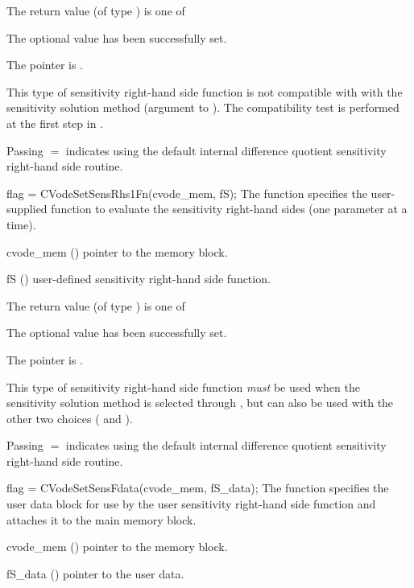 {
  The return value  (of type ) is one of
  \begin{args}
  \item[\Id{SUCCESS}] 
    The optional value has been successfully set.
  \item[\Id{CVS\_NO\_MEM}]
    The  pointer is .
  \end{args}
}
{
  This type of sensitivity right-hand side function is not compatible with
  with the  sensitivity solution method (argument 
  to ). The compatibility test is performed at the first
  step in .

  Passing $=$ indicates using the default internal difference 
  quotient sensitivity right-hand side routine.
}
{
  flag = CVodeSetSensRhs1Fn(cvode\_mem, fS);
}
{
  The function  specifies the user-supplied {\C} function
  to evaluate the sensitivity right-hand sides (one parameter at a time).
}
{
  \begin{args}
  \item[cvode\_mem] ()
    pointer to the {\cvodes} memory block.
  \item[fS] ()
    user-defined sensitivity right-hand side function.
  \end{args}
}
{
  The return value  (of type ) is one of
  \begin{args}
  \item[\Id{SUCCESS}] 
    The optional value has been successfully set.
  \item[\Id{CVS\_NO\_MEM}]
    The  pointer is .
  \end{args}
}
{
  This type of sensitivity right-hand side function {\em must} be used when
  the  sensitivity solution method is selected through
  , but can also be used with the other two choices
  ( and ).

  Passing $=$ indicates using the default internal difference 
  quotient sensitivity right-hand side routine.
}
{
  flag = CVodeSetSensFdata(cvode\_mem, fS\_data);
}
{
  The function  specifies the user data block 
  for use by the user sensitivity right-hand side function and attaches 
  it to the main {\cvodes} memory block.
}
{
  \begin{args}
  \item[cvode\_mem] ()
    pointer to the {\cvodes} memory block.
  \item[fS\_data] ()
    pointer to the user data.
  \end{args}
}

